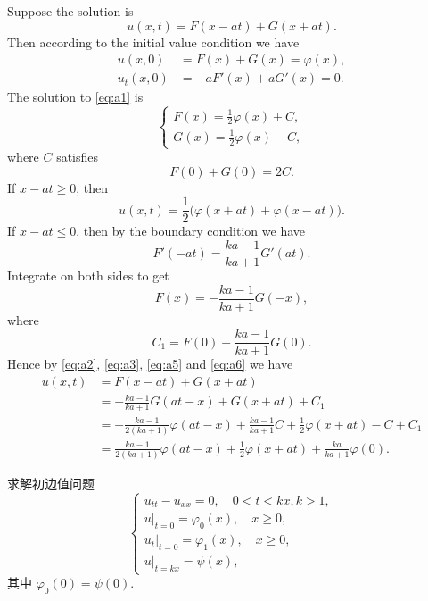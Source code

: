 \begin{solution}
  Suppose the solution is
  \[ u(x,t) = F(x-at) + G(x+at). \]
  Then according to the initial value condition we have
  \begin{equation}\label{eq:a1}
    \begin{aligned}
      u(x,0) & = F(x) + G(x) = \varphi(x), \\
      u_t(x,0) & = -a F'(x) + a G'(x) = 0.
    \end{aligned}
  \end{equation}
  The solution to \eqref{eq:a1} is
  \begin{equation}\label{eq:a2}
    \begin{cases}
      F(x) = \frac12 \varphi(x) + C, \\
      G(x) = \frac12 \varphi(x) - C,
    \end{cases}
  \end{equation}
  where $C$ satisfies
  \begin{equation}\label{eq:a3}
    F(0) + G(0) = 2C.
  \end{equation}
  If $x-at\geq 0$, then
  \[ \boxed{u(x,t) = \frac12 \bigl(\varphi(x+at) + \varphi(x-at)\bigr).} \]
  If $x-at\leq 0$, then by the boundary condition we have
  \begin{equation}\label{eq:a4}
    F'(-at) = \frac{ka-1}{ka+1} G'(at).
  \end{equation}
  Integrate on both sides to get
  \begin{equation}\label{eq:a5}
    F(x) = - \frac{ka-1}{ka+1} G(-x),
  \end{equation}
  where
  \begin{equation}\label{eq:a6}
    C_1 = F(0) + \frac{ka-1}{ka+1} G(0).
  \end{equation}
  Hence by \eqref{eq:a2}, \eqref{eq:a3}, \eqref{eq:a5} and \eqref{eq:a6} we have
  \begin{align*}
    u(x,t)
    & = F(x-at) + G(x+at) \\
    & = - \frac{ka-1}{ka+1} G(at-x) + G(x+at) + C_1 \\
    & = - \frac{ka-1}{2(ka+1)} \varphi(at-x) + \frac{ka-1}{ka+1} C
        + \frac12\varphi(x+at) - C + C_1 \\
    & = \frac{ka-1}{2(ka+1)} \varphi(at-x) + \frac12 \varphi(x+at)
        + \frac{ka}{ka+1} \varphi(0).
  \end{align*}
\end{solution}

\begin{exercise}[6]
  求解初边值问题
  \[\begin{cases}
    u_{tt} - u_{xx} = 0,\quad 0<t<kx, k>1, \\
    u|_{t=0} = \varphi_0(x),\quad x\geq 0, \\
    u_t|_{t=0} = \varphi_1(x),\quad x\geq 0, \\
    u|_{t=kx} = \psi(x),
  \end{cases}\]
  其中 $\varphi_0(0) = \psi(0)$.
\end{exercise}

